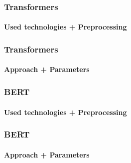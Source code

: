 \documentclass[english,handout]{mlutalk}
\begin{document}
\begin{frame}
  \frametitle{Transformers}
  \framesubtitle{Used technologies + Preprocessing}
  

\end{frame}

\begin{frame}
  \frametitle{Transformers}
  \framesubtitle{Approach + Parameters}
  

\end{frame}

\begin{frame}
  \frametitle{BERT}
  \framesubtitle{Used technologies + Preprocessing}
  

\end{frame}

\begin{frame}
  \frametitle{BERT}
  \framesubtitle{Approach + Parameters}
    
  

\end{frame}

\end{document}
